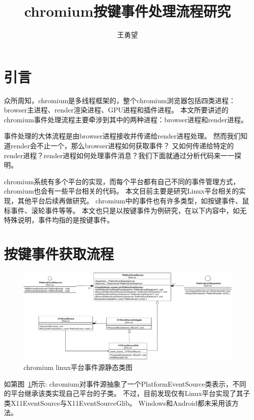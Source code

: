 \documentclass[12pt]{article}
\title{chromium按键事件处理流程研究}
\author{王勇望}
\begin{document}
\maketitle
\newpage

\section{引言}
众所周知，chromium是多线程框架的，整个chromium浏览器包括四类进程：browser主进程、render渲染进程、GPU进程和插件进程。
本文所要讲述的chromium事件处理流程主要牵涉到其中的两种进程：browser进程和render进程。

事件处理的大体流程是由browser进程接收并传递给render进程处理。
然而我们知道render会不止一个，那么browser进程如何获取事件？
又如何传递给特定的render进程？render进程如何处理事件消息？我们下面就通过分析代码来一一探明。

chromium系统有多个平台的实现，而每个平台都有自己不同的事件管理方式，chromium也会有一些平台相关的代码。
本文目前主要是研究Linux平台相关的实现，其他平台后续再做研究。
chromium中的事件也有许多类型，如按键事件、鼠标事件、滚轮事件等等。
本文也只是以按键事件为例研究，在以下内容中，如无特殊说明，事件均指的是按键事件。

\section{按键事件获取流程}
\begin{figure}[H] 
  \centering 
  \includegraphics[width=\textwidth]{image/linux_event_source_class.pdf} 
  \caption{chromium linux平台事件源静态类图} \label{fig:linux_event_source_class} 
\end{figure}

如第图~\ref{fig:linux_event_source_class}所示:
chromium对事件源抽象了一个PlatformEventSource类表示，不同的平台继承该类实现自己平台的子类。
不过，目前发现仅有Linux平台实现了其子类X11EventSource与X11EventSourceGlib。
Windows和Android都未采用该方法。
\end{document}
